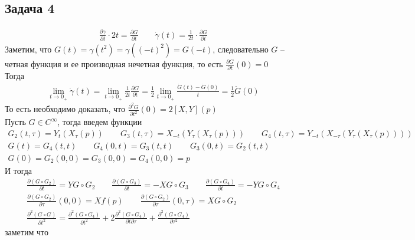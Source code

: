 \subsection*{Задача 4}
	\begin{gather*}
		\frac{\partial \gamma}{\partial t} \cdot 2t = \frac{\partial G}{\partial t}\qquad
		\dot{\gamma}(t) = \frac{1}{2t} \cdot \frac{\partial G}{\partial t}
	\end{gather*}
	Заметим, что $G(t) = \gamma(t^2) = \gamma((-t)^2) = G(-t)$, следовательно $G$ -- четная функция и ее производная нечетная функция, то есть $\frac{\partial G}{\partial t}(0) = 0$\\
	Тогда
	\begin{gather*}
		\lim\limits_{t \to 0_{+}} \dot{\gamma}(t) = \lim\limits_{t \to 0_{+}} \frac{1}{2t} \frac{\partial G}{\partial t} = 
		\frac{1}{2} \lim\limits_{t \to 0_{+}} \frac{\dot{G}(t) - \dot{G}(0)}{t} =
		\frac{1}{2} \ddot{G}(0)
	\end{gather*}
	То есть необходимо доказать, что $\frac{\partial^2 G}{\partial t^2}(0) = 2[X,Y](p)$\\
	Пусть $G \in C^{\infty}$, тогда введем функции
	\begin{gather*}
		G_{2}(t,{\tau}) = Y_t(X_{\tau}(p))\qquad G_{3}(t,{\tau}) = X_{-t}(Y_{\tau}(X_{\tau}(p)))\qquad G_{4}(t,{\tau}) = Y_{-t}(X_{-{\tau}}(Y_{\tau}(X_{\tau}(p))))\\
		G(t) = G_{4}(t,t)\qquad G_{4}(0,t) = G_{3}(t,t)\qquad G_{3}(0,t) = G_{2}(t,t)\\
		G(0) = G_{2}(0,0) = G_{3}(0,0) = G_{4}(0,0) = p
	\end{gather*}
	И тогда
	\begin{gather*}
		\frac{\partial (G \circ G_{2})}{\partial t} = Y G \circ G_{2}\qquad
		\frac{\partial (G \circ G_{3})}{\partial t} = -X G \circ G_{3}\qquad
		\frac{\partial (G\circ G_{4})}{\partial t} = -Y G\circ G_{4}\\
		\frac{\partial (G\circ G_{2})}{\partial {\tau}}(0,0) = X f(p)\qquad
		\frac{\partial (G\circ G_{2})}{\partial {\tau}}(0,{\tau}) = X G\circ G_{2}\\
		\frac{\partial^2 (G\circ G)}{\partial t^2} = \frac{\partial^2 (G\circ G_{4})}{\partial t^2} + 2\frac{\partial^2 (G\circ G_{4})}{\partial t \partial {\tau}} + \frac{\partial^2 (G\circ G_{4})}{\partial {\tau}^2}
	\end{gather*}
	заметим что
